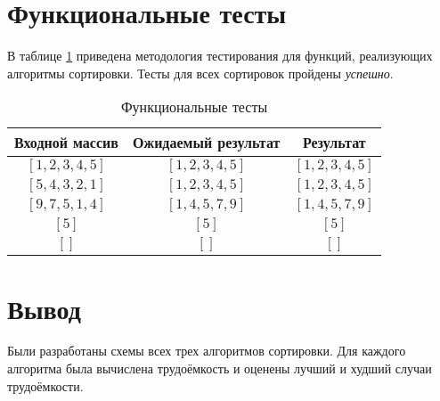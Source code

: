 \section{Функциональные тесты}

В таблице \ref{tbl:functional_test} приведена методология тестирования для функций, реализующих алгоритмы сортировки. Тесты для всех сортировок пройдены \textit{успешно}.
\clearpage


\begin{table}[h]
	\begin{center}
		\begin{threeparttable}
		\captionsetup{justification=raggedright,singlelinecheck=off}
		\caption{\label{tbl:functional_test} Функциональные тесты}
		\begin{tabular}{|c|c|c|}
			\hline
			Входной массив & Ожидаемый результат & Результат \\ 
			\hline
			$[1, 2, 3, 4, 5]$ & $[1, 2, 3, 4, 5]$  & $[1, 2, 3, 4, 5]$\\
			$[5, 4, 3, 2, 1]$  & $[1, 2, 3, 4, 5]$ & $[1, 2, 3, 4, 5]$\\
			$[9, 7, 5, 1, 4]$  & $[1, 4, 5, 7, 9]$  & $[1, 4, 5, 7, 9]$\\
			$[5]$  & $[5]$  & $[5]$\\
			$[]$  & $[]$  & $[]$\\
			\hline
		\end{tabular}
    \end{threeparttable}
	\end{center}
\end{table}


\section*{Вывод}

Были разработаны схемы всех трех алгоритмов сортировки. Для каждого алгоритма была вычислена трудоёмкость и оценены лучший и худший случаи трудоёмкости.
